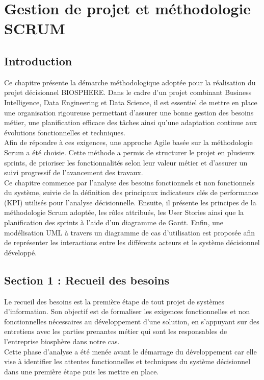 \newpage

\pagestyle{fancy}
\renewcommand{\headrulewidth}{0.5pt}
\renewcommand{\footrulewidth}{0.5pt}

\chapter{Gestion de projet et méthodologie SCRUM}\setlength{\headheight}{28pt}
\label{ch2}
\minitoc
\newpage

\section{Introduction}
Ce chapitre présente la démarche méthodologique adoptée pour la réalisation du projet décisionnel BIOSPHERE. Dans le cadre d’un projet combinant Business Intelligence, Data Engineering et Data Science, il est essentiel de mettre en place une organisation rigoureuse permettant d’assurer une bonne gestion des besoins métier, une planification efficace des tâches ainsi qu’une adaptation continue aux évolutions fonctionnelles et techniques.\\
Afin de répondre à ces exigences, une approche Agile basée sur la méthodologie Scrum a été choisie. Cette méthode a permis de structurer le projet en plusieurs sprints, de prioriser les fonctionnalités selon leur valeur métier et d’assurer un suivi progressif de l’avancement des travaux.\\
Ce chapitre commence par l’analyse des besoins fonctionnels et non fonctionnels du système, suivie de la définition des principaux indicateurs clés de performance (KPI) utilisés pour l’analyse décisionnelle. Ensuite, il présente les principes de la méthodologie Scrum adoptée, les rôles attribués, les User Stories ainsi que la planification des sprints à l’aide d’un diagramme de Gantt. Enfin, une modélisation UML à travers un diagramme de cas d’utilisation est proposée afin de représenter les interactions entre les différents acteurs et le système décisionnel développé.
\section{Section 1 : Recueil des besoins}
Le recueil des besoins est la première étape de tout projet de systèmes d'information. Son objectif est de formaliser les exigences fonctionnelles et non fonctionnelles nécessaires au développement d'une solution, en s'appuyant sur des entretiens avec les parties prenantes métier qui sont les responsables de l’entreprise biosphère dans notre cas.\\
Cette phase d'analyse a été menée avant le démarrage du développement car elle vise à identifier les attentes fonctionnelles et techniques du système décisionnel dans une première étape puis les mettre en place.
